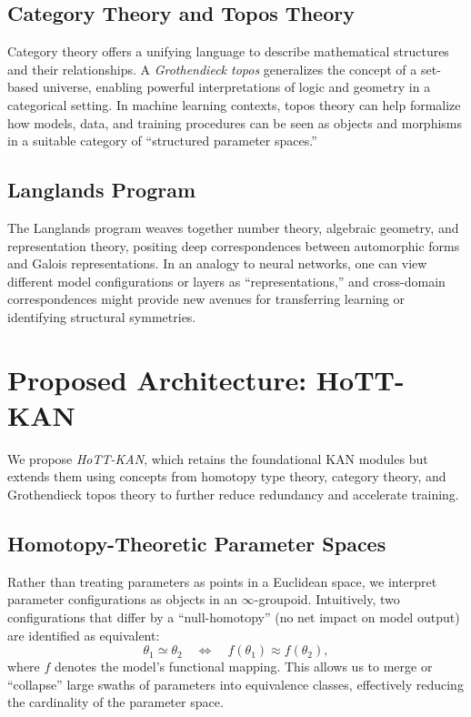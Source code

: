 \documentclass{article}
\begin{document}
\subsection{Category Theory and Topos Theory}
Category theory \citep{maclane1971categories} offers a unifying language to describe mathematical structures and their relationships. A \emph{Grothendieck topos} \citep{grothendieck1972} generalizes the concept of a set-based universe, enabling powerful interpretations of logic and geometry in a categorical setting. In machine learning contexts, topos theory can help formalize how models, data, and training procedures can be seen as objects and morphisms in a suitable category of “structured parameter spaces.”

\subsection{Langlands Program}
The Langlands program \citep{langlands1970problems} weaves together number theory, algebraic geometry, and representation theory, positing deep correspondences between automorphic forms and Galois representations. In an analogy to neural networks, one can view different model configurations or layers as “representations,” and cross-domain correspondences might provide new avenues for transferring learning or identifying structural symmetries.

\section{Proposed Architecture: HoTT-KAN}
\label{sec:hott_kan_arch}

We propose \emph{HoTT-KAN}, which retains the foundational KAN modules but extends them using concepts from homotopy type theory, category theory, and Grothendieck topos theory to further reduce redundancy and accelerate training.

\subsection{Homotopy-Theoretic Parameter Spaces}
Rather than treating parameters as points in a Euclidean space, we interpret parameter configurations as objects in an \(\infty\)-groupoid. Intuitively, two configurations that differ by a “null-homotopy” (no net impact on model output) are identified as equivalent:
\begin{equation}
    \theta_1 \simeq \theta_2 \quad \Leftrightarrow \quad f(\theta_1) \approx f(\theta_2),
\end{equation}
where \( f \) denotes the model’s functional mapping. This allows us to merge or “collapse” large swaths of parameters into equivalence classes, effectively reducing the cardinality of the parameter space.
\end{document}
